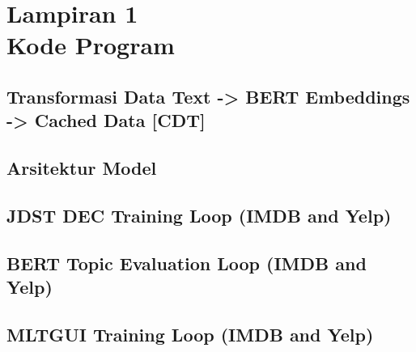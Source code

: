 \chapter*{Lampiran 1 \\ Kode Program}


\section*{Transformasi Data Text -> BERT Embeddings -> Cached Data [CDT]}



\section*{Arsitektur Model}


\section*{JDST DEC Training Loop (IMDB and Yelp)}



\section*{BERT Topic Evaluation Loop (IMDB and Yelp)}


\section*{MLTGUI Training Loop (IMDB and Yelp)}
